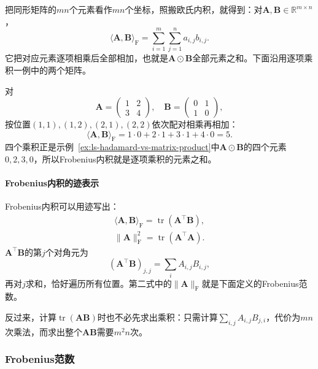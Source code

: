 把同形矩阵的$mn$个元素看作$mn$个坐标，照搬欧氏内积，就得到：对$\bm A,\bm B\in\mathbb R^{m\times n}$，
\begin{equation}
 \langle\bm A,\bm B\rangle_{\mathrm F}=\sum_{i=1}^m\sum_{j=1}^na_{i,j}b_{i,j}.
 \label{eq:ls-frobenius-inner-product}
\end{equation}
它把对应元素逐项相乘后全部相加，也就是$\bm A\odot\bm B$全部元素之和。下面沿用逐项乘积一例中的两个矩阵。
\begin{example}[Frobenius内积的计算]
\label{ex:ls-frobenius-inner-product}
对
\[
 \bm A=\begin{pmatrix}1&2\\3&4\end{pmatrix},\quad
 \bm B=\begin{pmatrix}0&1\\1&0\end{pmatrix},
\]
按位置$(1,1),(1,2),(2,1),(2,2)$依次配对相乘再相加：
\[
 \langle\bm A,\bm B\rangle_{\mathrm F}=1\cdot0+2\cdot1+3\cdot1+4\cdot0=5.
\]
四个乘积正是示例~\ref{ex:ls-hadamard-vs-matrix-product}中$\bm A\odot\bm B$的四个元素$0,2,3,0$，所以Frobenius内积就是逐项乘积的元素之和。
\end{example}

\paragraph{Frobenius内积的迹表示}
Frobenius内积可以用迹写出：
\begin{equation}
 \begin{gathered}
 \langle\bm A,\bm B\rangle_{\mathrm F}=\operatorname{tr}(\bm A^\top\bm B),\\
 \lVert\bm A\rVert_{\mathrm F}^2=\operatorname{tr}(\bm A^\top\bm A).
 \end{gathered}
 \label{eq:ls-frobenius-trace}
\end{equation}
$\bm A^\top\bm B$的第$j$个对角元为
\[
 (\bm A^\top\bm B)_{j,j}=\sum_i A_{i,j}B_{i,j},
\]
再对$j$求和，恰好遍历所有位置。第二式中的$\lVert\bm A\rVert_{\mathrm F}$就是下面定义的Frobenius范数。

反过来，计算$\operatorname{tr}(\bm A\bm B)$时也不必先求出乘积：只需计算$\sum_{i,j}A_{i,j}B_{j,i}$，代价为$mn$次乘法，而求出整个$\bm A\bm B$需要$m^2n$次。

\subsubsection{Frobenius范数}
\label{sec:ls-frobenius-norm}

